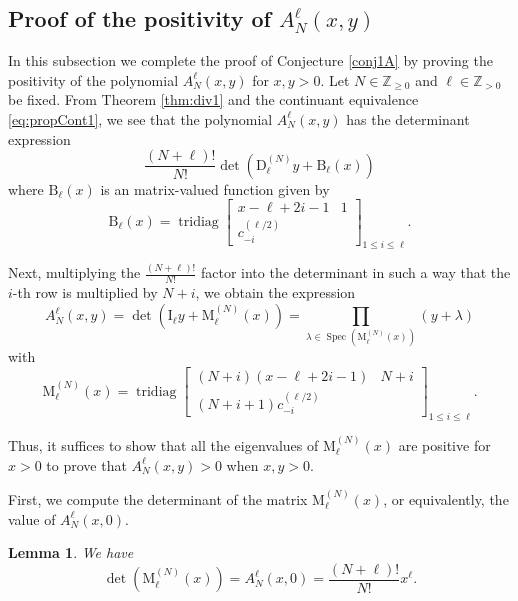 \documentclass[11pt]{article}
\numberwithin{equation}{section}
\newcommand{\Z}{\mathbb{Z}} %
\DeclareMathOperator{\Spec}{Spec}
\DeclareMathOperator{\tridiag}{tridiag}
\newcommand{\Tridiag}[4]{\tridiag\mat{#1 & #2 \\ #3}_{#4}}
\newcommand{\mat}[1]{\begin{bmatrix}#1\end{bmatrix}}
\newcommand{\MatSymbol}[1]{\bm{\mathrm{#1}}}
\newcommand{\mB}{\MatSymbol{B}}
\newcommand{\mD}{\MatSymbol{D}}
\newcommand{\mM}{\MatSymbol{M}}
\newcommand{\mI}{\MatSymbol{I}}
\theoremstyle{plain}
\newtheorem{lem}[thm]{Lemma}
\theoremstyle{definition}
\theoremstyle{remark}
\begin{document}
\subsection{Proof of the positivity of \texorpdfstring{$A_N^{\ell}(x,y) $}{A(x,y)}}\label{sec:pos}

In this subsection we complete the proof of Conjecture \ref{conj1A} by proving the positivity of
the polynomial \(A_N^\ell(x,y)\) for \(x,y>0\). Let \( N \in \Z_{\geq 0}\) and \( \ell \in \Z_{>0}\) be fixed.
From Theorem \ref{thm:div1} and the continuant equivalence \eqref{eq:propCont1}, we see that the polynomial \(A_N^\ell(x,y)\) has
the determinant expression
\[
  \frac{(N+\ell)!}{N!} \det( \mD^{(N)}_{\ell} y + \mB_{\ell}(x) )
\]
where \(\mB_{\ell}(x)  \) is an matrix-valued function given by
\begin{equation}
  \label{eq:matbx}
  \mB_{\ell}(x) = \Tridiag{x-\ell+2i-1}{1}{c^{(\ell/2)}_{-i}}{1\le i\le \ell}.
\end{equation}

Next, multiplying the \(\frac{(N+\ell)!}{N!}\) factor into the determinant in such a way that the
\(i\)-th row  is multiplied by \(N+i\), we obtain the expression
\begin{equation}
  \label{eq:Adetexp}
  A_N^\ell(x,y) = \det(\mI_\ell y + \mM^{(N)}_\ell(x)) {}= \prod_{\lambda\in\Spec(\mM^{(N)}_\ell(x))}(y+\lambda)
\end{equation}
with
\begin{equation*}
  \mM^{(N)}_\ell(x) = \Tridiag{(N+i)(x-\ell+2i-1)}{N+i}{(N+i+1)c^{(\ell/2)}_{-i}}{1\le i\le \ell}.
\end{equation*}

Thus, it suffices to show that all the eigenvalues of \(\mM^{(N)}_\ell(x)\) are positive for \(x > 0 \) to prove that
$A_N^\ell(x,y)>0$ when $x,y>0$.

First, we compute the determinant of the matrix \(\mM^{(N)}_\ell(x)\), or equivalently, the value of \(A_N^{\ell}(x,0)\).

\begin{lem}
  \label{lem:detM}
  We have
  \[ \det(\mM^{(N)}_\ell(x)) = A_N^{\ell}(x,0)  =\frac{(N+\ell)!}{N!} x^{\ell}.\]
\end{lem}
\end{document}
